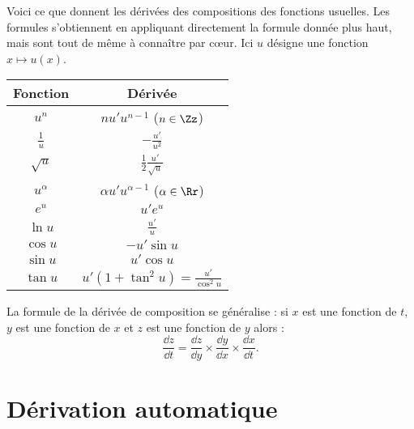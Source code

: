 \documentclass[11pt,class=report,crop=false]{standalone}
\begin{document}
Voici ce que donnent les dérivées des compositions des fonctions usuelles. Les formules s'obtiennent en appliquant directement la formule donnée plus haut, mais sont tout de même à connaître par c\oe ur.
Ici $u$ désigne une fonction $x \mapsto u(x)$.
\begin{center}
\setlength{\arrayrulewidth}{0.05mm}
\begin{tabular}[t]{|c|c@{\vrule depth 1.2ex height 3ex width 0mm \ }|}
\hline
\textbf{Fonction}         & \textbf{Dérivée} \\ \hline
   $u^n$         & $nu'u^{n-1}$  \quad  ($n \in \Zz$)   \\ \hline
   $\frac 1u$    & $-\frac{u'}{u^2}$              \\ \hline
   $\sqrt{u}$    & $\frac12 \frac{u'}{\sqrt{u}}$   \\ \hline
   $u^\alpha$    & $\alpha u' u^{\alpha-1}$ \quad ($\alpha\in\Rr$)  \\ \hline
   $e^u$         & $u'e^u$                        \\ \hline
   $\ln u$       & $\frac {u'}{u}$                   \\ \hline
   $\cos u$      & $-u'\sin u$                    \\ \hline
   $\sin u$      & $u'\cos u$                     \\ \hline
   $\tan u$      & $u'(1+\tan^2 u) = \frac{u'}{\cos^2 u}$        \\ \hline
\end{tabular}
\hfill
\end{center}


La formule de la dérivée de composition se généralise : si $x$ est une fonction de $t$, $y$ est une fonction de $x$ et $z$ est une fonction de $y$ alors :
$$\frac{\dd z}{\dd t}  = \frac{\dd z}{\dd y} \times \frac{\dd y}{\dd x} \times \frac{\dd x}{\dd t}.$$



\section{Dérivation automatique}


\end{document}
